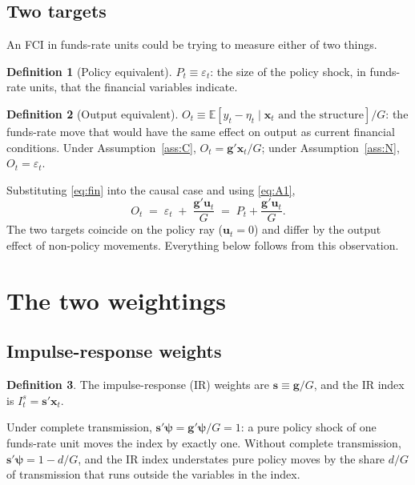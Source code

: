 \documentclass[11pt]{article}
\theoremstyle{definition}
\newtheorem{definition}{Definition}
\theoremstyle{remark}
\newcommand{\E}{\mathbb{E}}
\newcommand{\bpsi}{\boldsymbol{\psi}}
\newcommand{\bx}{\mathbf{x}}
\newcommand{\bu}{\mathbf{u}}
\newcommand{\bg}{\mathbf{g}}
\newcommand{\bs}{\mathbf{s}}
\begin{document}
\subsection{Two targets}

An FCI in funds-rate units could be trying to measure either of two things.

\begin{definition}[Policy equivalent]
$P_t \equiv \varepsilon_t$: the size of the policy shock, in funds-rate units, that the financial variables indicate.
\end{definition}

\begin{definition}[Output equivalent]
$O_t \equiv \E[y_t - \eta_t \mid \bx_t\text{ and the structure}]/G$: the funds-rate move that would have the same effect on output as current financial conditions. Under Assumption~\ref{ass:C}, $O_t = \bg'\bx_t/G$; under Assumption~\ref{ass:N}, $O_t=\varepsilon_t$.
\end{definition}

Substituting \eqref{eq:fin} into the causal case and using \eqref{eq:A1},
\begin{equation}\label{eq:OP}
O_t \;=\; \varepsilon_t \;+\; \frac{\bg'\bu_t}{G} \;=\; P_t + \frac{\bg'\bu_t}{G}.
\end{equation}
The two targets coincide on the policy ray ($\bu_t=0$) and differ by the output effect of non-policy movements. Everything below follows from this observation.

\section{The two weightings}

\subsection{Impulse-response weights}

\begin{definition}
The impulse-response (IR) weights are $\bs \equiv \bg/G$, and the IR index is $I^s_t = \bs'\bx_t$.
\end{definition}

Under complete transmission, $\bs'\bpsi = \bg'\bpsi/G = 1$: a pure policy shock of one funds-rate unit moves the index by exactly one. Without complete transmission, $\bs'\bpsi = 1 - d/G$, and the IR index understates pure policy moves by the share $d/G$ of transmission that runs outside the variables in the index.
\end{document}
